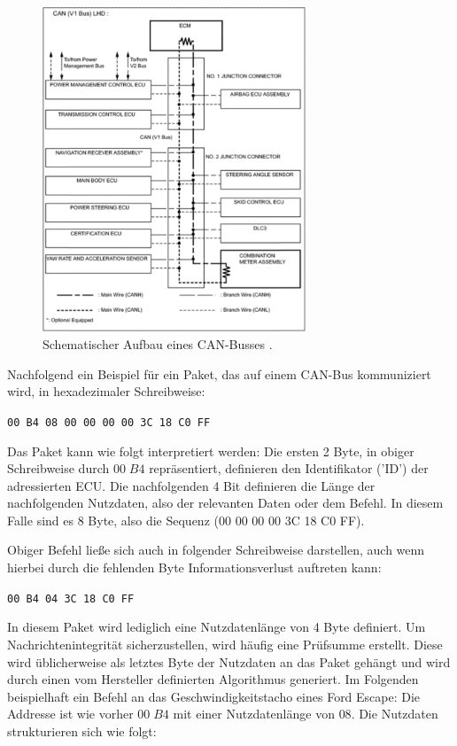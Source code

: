 \documentclass[
    fontsize=12pt,
    headings=small,
    parskip=half,           %
    bibliography=totoc,
    numbers=noenddot,       %
    open=any,               %
    ]{scrreprt}
\begin{document}
\FloatBarrier
\begin{figure}[h!]
	\centering
  \includegraphics[width=0.7\textwidth,keepaspectratio]{pic/can-bus.png}
	\caption{Schematischer Aufbau eines CAN-Busses \cite{MiV13}.}
\end{figure}
\FloatBarrier
\newpage


Nachfolgend ein Beispiel für ein Paket, das auf einem CAN-Bus kommuniziert wird, in hexadezimaler Schreibweise:

\centerline{\texttt{00 B4 08 00 00 00 00 3C 18 C0 FF}}

Das Paket kann wie folgt interpretiert werden:
Die ersten 2 Byte, in obiger Schreibweise durch $00\;B4$ repräsentiert, definieren den Identifikator ('ID') der adressierten ECU. Die nachfolgenden 4 Bit definieren die Länge der nachfolgenden Nutzdaten, also der relevanten Daten oder dem Befehl. In diesem Falle sind es 8 Byte, also die Sequenz (00 00 00 00 3C 18 C0 FF).

Obiger Befehl ließe sich auch in folgender Schreibweise darstellen, auch wenn hierbei durch die fehlenden Byte Informationsverlust auftreten kann:

\centerline{\texttt{00 B4 04 3C 18 C0 FF}}

In diesem Paket wird lediglich eine Nutzdatenlänge von 4 Byte definiert. Um Nachrichtenintegrität sicherzustellen, wird häufig eine Prüfsumme erstellt. Diese wird üblicherweise als letztes Byte der Nutzdaten an das Paket gehängt und wird durch einen vom Hersteller definierten Algorithmus generiert.
Im Folgenden beispielhaft ein Befehl an das Geschwindigkeitstacho eines Ford Escape:
Die Addresse ist wie vorher $00\;B4$ mit einer Nutzdatenlänge von $08$. Die Nutzdaten strukturieren sich wie folgt:
\end{document}
